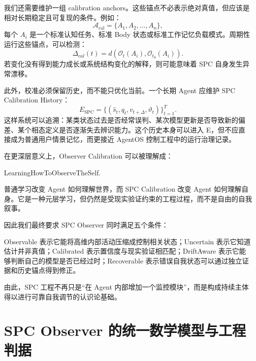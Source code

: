 我们还需要维护一组 calibration anchors。这些锚点不必表示绝对真值，但应该是相对长期稳定且可复现的条件。例如：
\begin{equation}
\mathcal A_{\mathrm{cal}}
=
\{
A_1,A_2,\ldots,A_n
\},
\end{equation}
每个 $A_i$ 是一个标准认知任务、标准 Body 状态或标准工作记忆负载模式。周期性运行这些锚点，可以检测：
\begin{equation}
\Delta_{cal}(t)
=
d
\left(
\mathcal O_t(A_i),
\mathcal O_{t_0}(A_i)
\right).
\end{equation}
若变化没有得到能力成长或系统结构变化的解释，则可能意味着 SPC 自身发生异常漂移。

此外，校准必须保留历史，而不能只优化当前。一个长期 Agent 应维护 SPC Calibration History：
\begin{equation}
E_{\mathrm{SPC}}
=
\{
(\hat s_t,q_t,v_{t+\Delta},\vartheta_t)
\}_{t=1}^{T}.
\end{equation}
这样系统可以追溯：某类状态过去是否经常误判、某次模型更新是否导致新的偏差、某个相态定义是否逐渐失去辨识能力。这个历史本身可以进入 E，但不应直接成为普通用户情景记忆，而更接近 AgentOS 控制工程中的运行治理记录。

在更深层意义上，Observer Calibration 可以被理解成：
\begin{statementbox}
LearningHowToObserveTheSelf.
\end{statementbox}
普通学习改变 Agent 如何理解世界，而 SPC Calibration 改变 Agent 如何理解自身。它是一种元层学习，但仍然是受现实验证约束的工程过程，而不是自由的自我叙事。

因此我们最终要求 SPC Observer 同时满足五个条件：
\begin{statementbox}
\centering
{}
\end{statementbox}
Observable 表示它能将高维内部活动压缩成控制相关状态；Uncertain 表示它知道估计并非真值；Calibrated 表示置信度与现实验证相匹配；DriftAware 表示它能够判断自己的模型是否已经过时；Recoverable 表示错误自我状态可以通过独立证据和历史锚点得到修正。

由此，SPC 工程不再只是“在 Agent 内部增加一个监控模块”，而是构成持续主体得以进行可靠自我调节的认识论基础。

\section{SPC Observer 的统一数学模型与工程判据}
\label{sec:spc-unified-model}

